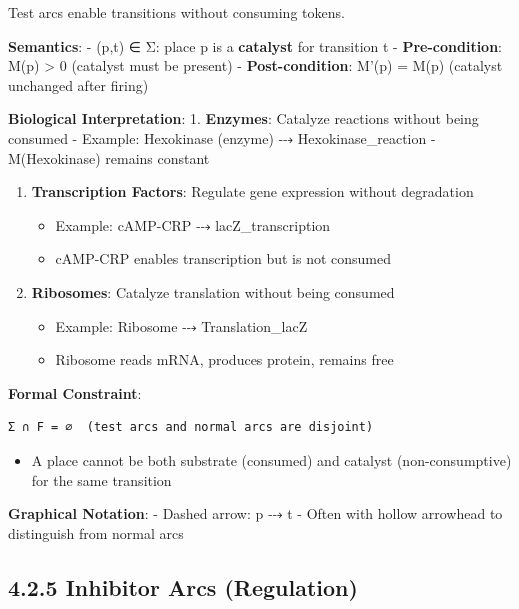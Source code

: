 Test arcs enable transitions without consuming tokens.

\textbf{Semantics}: - (p,t) ∈ Σ: place p is a \textbf{catalyst} for
transition t - \textbf{Pre-condition}: M(p) \textgreater{} 0 (catalyst
must be present) - \textbf{Post-condition}: M'(p) = M(p) (catalyst
unchanged after firing)

\textbf{Biological Interpretation}: 1. \textbf{Enzymes}: Catalyze
reactions without being consumed - Example: Hexokinase (enzyme) ⤏
Hexokinase\_reaction - M(Hexokinase) remains constant

\begin{enumerate}
\def\labelenumi{\arabic{enumi}.}
\setcounter{enumi}{1}
\tightlist
\item
  \textbf{Transcription Factors}: Regulate gene expression without
  degradation

  \begin{itemize}
  \tightlist
  \item
    Example: cAMP-CRP ⤏ lacZ\_transcription
  \item
    cAMP-CRP enables transcription but is not consumed
  \end{itemize}
\item
  \textbf{Ribosomes}: Catalyze translation without being consumed

  \begin{itemize}
  \tightlist
  \item
    Example: Ribosome ⤏ Translation\_lacZ
  \item
    Ribosome reads mRNA, produces protein, remains free
  \end{itemize}
\end{enumerate}

\textbf{Formal Constraint}:

\begin{lstlisting}
Σ ∩ F = ∅  (test arcs and normal arcs are disjoint)
\end{lstlisting}

\begin{itemize}
\tightlist
\item
  A place cannot be both substrate (consumed) and catalyst
  (non-consumptive) for the same transition
\end{itemize}

\textbf{Graphical Notation}: - Dashed arrow: p ⤏ t - Often with hollow
arrowhead to distinguish from normal arcs

\hypertarget{inhibitor-arcs-regulation}{%
\subsection{4.2.5 Inhibitor Arcs
(Regulation)}\label{inhibitor-arcs-regulation}}

